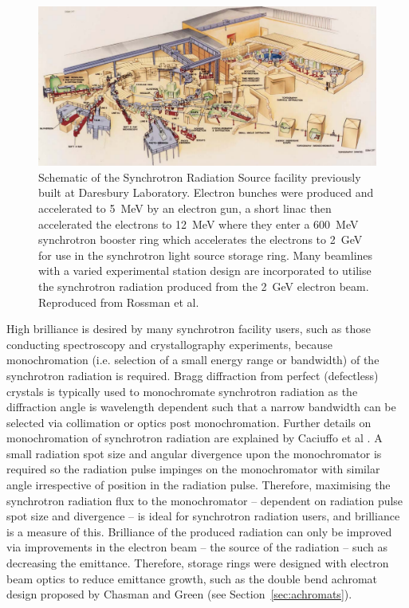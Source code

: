 \documentclass[../main.tex]{subfiles}
\begin{document}
\begin{figure}[!h]
\centering
\includegraphics[width=\textwidth]{Figures/Introduction/Daresbury_SRS.pdf}
\caption{Schematic of the Synchrotron Radiation Source facility previously built at Daresbury Laboratory. Electron bunches were produced and accelerated to 5~\si{\mega\electronvolt} by an electron gun, a short linac then accelerated the electrons to 12~\si{\mega\electronvolt} where they enter a 600~\si{\mega\electronvolt} synchrotron booster ring which accelerates the electrons to 2~\si{\giga\electronvolt} for use in the synchrotron light source storage ring. Many beamlines with a varied experimental station design are incorporated to utilise the synchrotron radiation produced from the 2~\si{\giga\electronvolt} electron beam. Reproduced from Rossman et al\cite{rossmann2001international}.}
\label{fig:daresbury_SRS_diagram}
\end{figure}

High brilliance is desired by many synchrotron facility users, such as those conducting spectroscopy and crystallography experiments, because monochromation (i.e. selection of a small energy range or bandwidth) of the synchrotron radiation is required. Bragg diffraction from perfect (defectless) crystals is typically used to monochromate synchrotron radiation as the diffraction angle is wavelength dependent such that a narrow bandwidth can be selected via collimation or optics post monochromation. Further details on monochromation of synchrotron radiation are explained by Caciuffo et al \cite{caciuffo1987monochromators}. A small radiation spot size and angular divergence upon the monochromator is required so the radiation pulse impinges on the monochromator with similar angle irrespective of position in the radiation pulse. Therefore, maximising the synchrotron radiation flux to the monochromator -- dependent on radiation pulse spot size and divergence -- is ideal for synchrotron radiation users, and brilliance is a measure of this. Brilliance of the produced radiation can only be improved via improvements in the electron beam -- the source of the radiation -- such as decreasing the emittance. Therefore, storage rings were designed with electron beam optics to reduce emittance growth, such as the double bend achromat design proposed by Chasman and Green \cite{chasman1975preliminary} (see Section~\ref{sec:achromats}).          
\end{document}

